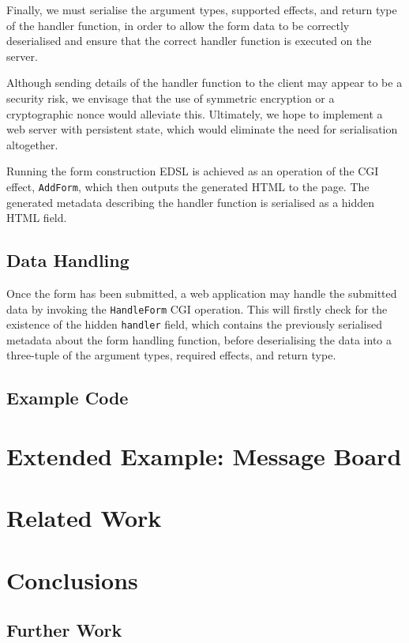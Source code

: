 \documentclass[preprint]{sigplanconf}
\begin{document}
Finally, we must serialise the argument types, supported effects, and return type of the handler function, in order to allow the form data to be correctly deserialised and ensure that the correct handler function is executed on the server. 

Although sending details of the handler function to the client may appear to be a security risk, we envisage that the use of symmetric encryption or a cryptographic nonce would alleviate this. Ultimately, we hope to implement a web server with persistent state, which would eliminate the need for serialisation altogether.

Running the form construction EDSL is achieved as an operation of the CGI effect, \texttt{AddForm}, which then outputs the generated HTML to the page. The generated metadata describing the handler function is serialised as a hidden HTML field.

\subsection{Data Handling}
Once the form has been submitted, a web application may handle the submitted data by invoking the \texttt{HandleForm} CGI operation. This will firstly check for the existence of the hidden \texttt{handler} field, which contains the previously serialised metadata about the form handling function, before deserialising the data into a three-tuple of the argument types, required effects, and return type.



\subsection{Example Code}

\section{Extended Example: Message Board}
\section{Related Work}
\section{Conclusions}
\subsection{Further Work}
\end{document}
